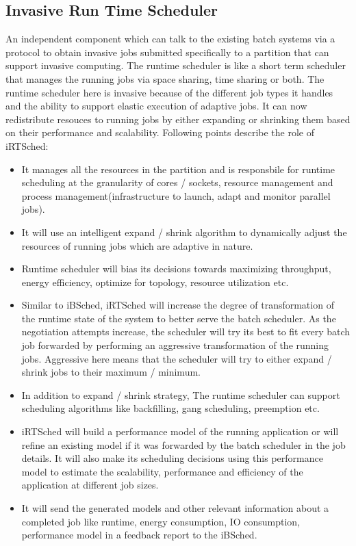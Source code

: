 \subsection{Invasive Run Time Scheduler}
An independent component which can talk to the existing batch systems via a protocol to obtain invasive jobs submitted specifically to a partition that can support invasive computing.
The runtime scheduler is like a short term scheduler that manages the running jobs via space sharing, time sharing or both. The runtime scheduler here is invasive because of the different job types it handles and the ability to support elastic execution of adaptive jobs. It can now redistribute resouces to running jobs by either expanding or shrinking them based on their performance and scalability. Following points describe the role of iRTSched:
\begin{itemize}
\item It manages all the resources in the partition and is responsbile for runtime scheduling at the granularity of cores / sockets, resource management and process management(infrastructure to launch, adapt and monitor parallel jobs).
\item It will use an intelligent expand / shrink algorithm to dynamically adjust the resources of running jobs which are adaptive in nature. 
\item Runtime scheduler will bias its decisions towards maximizing throughput, energy efficiency, optimize for topology, resource utilization etc.
\item Similar to iBSched, iRTSched will increase the degree of transformation of the runtime state of the system to better serve the batch scheduler. As the negotiation attempts increase, the scheduler will try its best to fit every batch job forwarded by performing an aggressive transformation of the running jobs. Aggressive here means that the scheduler will try to either expand / shrink jobs to their maximum / minimum.
\item In addition to expand / shrink strategy, The runtime scheduler can support scheduling algorithms like backfilling, gang scheduling, preemption etc.
\item iRTSched will build a performance model of the running application or will refine an existing model if it was forwarded by the batch scheduler in the job details. It will also make its scheduling decisions using this performance model to estimate the scalability, performance and efficiency of the application at different job sizes.
\item It will send the generated models and other relevant information about a completed job like runtime, energy consumption, IO consumption, performance model in a feedback report to the iBSched.
\end{itemize}
